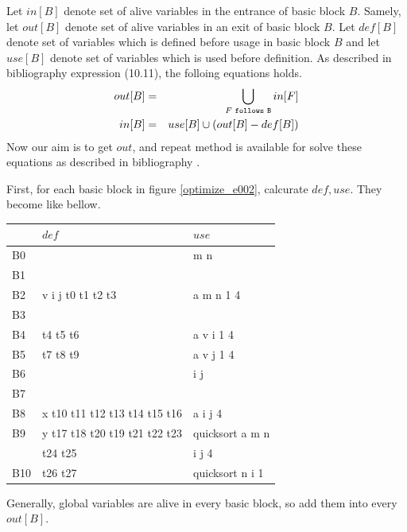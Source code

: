 Let $in[B]$ denote set of alive variables in the entrance of
basic block $B$. Samely, let $out[B]$ denote set of alive
variables in an exit of basic block $B$. Let $def[B]$ denote
set of variables which is defined before usage in basic
block $B$ and let $use[B]$ denote set of variables which is used before
definition. As described in bibliography \cite{doragon} expression
(10.11), the folloing equations holds.
\begin{eqnarray*}
out[B] & = & \bigcup_{F {\tt{\,\,follows\,\,} B}} in[F] \\
in[B]  & = & use[B] \cup (out[B] - def[B])
\end{eqnarray*}
Now our aim is to get $out$, and repeat method 
is available for solve these equations as described in bibliography
\cite{doragon}.

First, for each basic block in figure \ref{optimize_e002},
calcurate $def, use$. They become like bellow.

\vspace{0.5cm}

\begin{tabular}{|l|l|l|} \hline
   & $def$             & $use$     \\ \hline
B0 &                   & m n       \\ \hline
B1 &                   &           \\ \hline
B2 & v i j t0 t1 t2 t3 & a m n 1 4 \\ \hline
B3 &                   &           \\ \hline
B4 & t4 t5 t6          & a v i 1 4 \\ \hline
B5 & t7 t8 t9          & a v j 1 4 \\ \hline
B6 &                   & i j       \\ \hline
B7 &                   &           \\ \hline
B8 & x t10 t11 t12 t13 t14 t15 t16 & a i j 4 \\ \hline
B9 & y t17 t18 t20 t19 t21 t22 t23 & quicksort a m n \\
   & t24 t25                & i j 4 \\ \hline
B10 & t26 t27 & quicksort n i 1 \\ \hline
\end{tabular}

\vspace{0.5cm}

Generally, global variables are alive in every basic block, so
add them into every $out[B]$.

